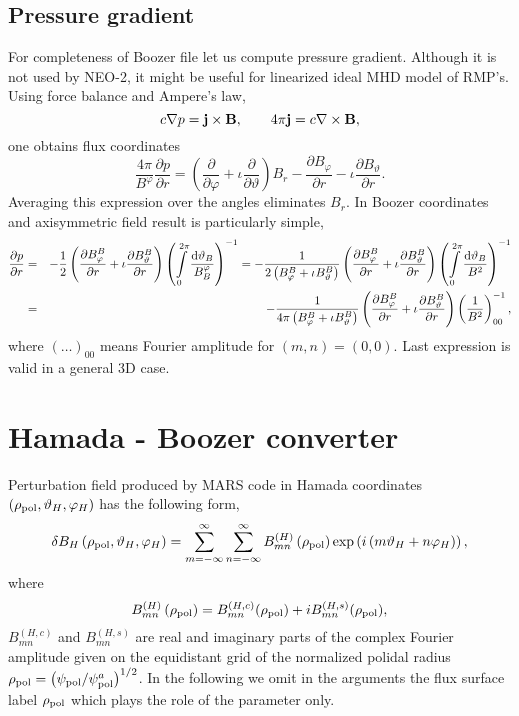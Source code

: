 \documentclass[12pt]{article}
\newcommand{\be}[1]{\begin{equation} \label{#1}}
\newcommand{\ee}{\end{equation}}
\newcommand{\bea}[1]{\begin{eqnarray} \label{#1}}
\newcommand{\eea}{\end{eqnarray}}
\newcommand{\difp}[2]{\frac{\partial #1}{\partial #2}}
\newcommand{\bB}{{\bf B}}
\newcommand{\bj}{{\bf j}}
\newcommand{\rd}{{\rm d}}
\begin{document}
\subsection{Pressure gradient}
\label{ssec:pressure}

\noindent
For completeness of Boozer file let us compute pressure gradient. Although it is not used by NEO-2, it might be useful
for linearized ideal MHD model of RMP's. Using force balance and Ampere's law,
\be{forceamp}
c\nabla p = \bj\times\bB, \qquad 4\pi\bj=c \nabla\times\bB,
\ee
one obtains flux coordinates
\be{influx}
\frac{4\pi}{B^\varphi}\difp{p}{r}=\left(\difp{}{\varphi}+\iota\difp{}{\vartheta}\right)B_r-\difp{B_\varphi}{r}-\iota\difp{B_\vartheta}{r}.
\ee
Averaging this expression over the angles eliminates $B_r$. In Boozer coordinates and axisymmetric field result is particularly simple,
\bea{dpdr}
\difp{p}{r}
&=&
-\frac{1}{2}\left(\difp{B^B_\varphi}{r}+\iota\difp{B^B_\vartheta}{r}\right)\left(\int\limits_0^{2\pi}\frac{\rd\vartheta_B}{B^\varphi_B}\right)^{-1}
=-\frac{1}{2\left(B^B_\varphi+\iota B^B_\vartheta\right)}
\left(\difp{B^B_\varphi}{r}+\iota\difp{B^B_\vartheta}{r}\right)\left(\int\limits_0^{2\pi}\frac{\rd\vartheta_B}{B^2}\right)^{-1}
\nonumber \\
&=& - \frac{1}{4\pi\left(B^B_\varphi+\iota B^B_\vartheta\right)}
\left(\difp{B^B_\varphi}{r}+\iota\difp{B^B_\vartheta}{r}\right)\left(\frac{1}{B^2}\right)_{00}^{-1},
\eea
where $(\dots)_{00}$ means Fourier amplitude for $(m,n)=(0,0)$. Last expression is valid in a general 3D case.

\section{Hamada - Boozer converter}

Perturbation field produced by MARS code in Hamada coordinates $\left(\rho_{\rm pol},\vartheta_H,\varphi_H\right)$ 
has the following form,
\be{hamada_input}
\delta B_H\left(\rho_{\rm pol},\vartheta_H,\varphi_H\right) = \sum \limits_{m=-\infty}^\infty\sum \limits_{n=-\infty}^\infty 
B_{mn}^{(H)}\left(\rho_{\rm pol}\right)\exp\left(i\left(m\vartheta_H+n \varphi_H\right)\right),
\ee
where
\be{complex_aham}
B_{mn}^{(H)}\left(\rho_{\rm pol}\right)=B_{mn}^{(H,c)}(\rho_{\rm pol})+i B_{mn}^{(H,s)}(\rho_{\rm pol}),
\ee
$B_{mn}^{(H,c)}$ and $B_{mn}^{(H,s)}$ are real and imaginary parts of the complex Fourier amplitude
given on the equidistant grid of the normalized polidal radius $\rho_{\rm pol}=\left(\psi_{\rm pol}/\psi_{\rm pol}^a\right)^{1/2}$.
In the following we omit in the arguments the flux surface label $\rho_{\rm pol}$ which plays the role of the parameter only.
\end{document}
